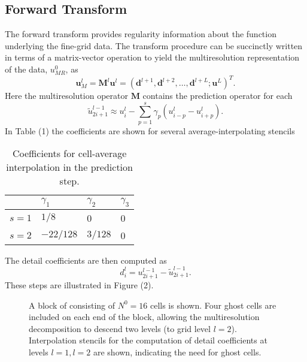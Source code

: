 \documentclass[12pt,letterpaper]{article}
\begin{document}

    \subsection*{Forward Transform}

        The forward transform provides regularity information about the function
        underlying the fine-grid data. The transform procedure can be succinctly
        written in terms of a matrix-vector operation to yield the
        multiresolution representation of the data, $u_{MR}^{0}$, as
        \begin{equation}
            \bm{u}_{M}^{l} = \bm{M}^{l} \bm{u}^{l} = \left( \bm{d}^{l+1}, \bm{d}^{l+2},
            \dots, \bm{d}^{l+L}; \bm{u}^{L} \right)^{T}.
        \end{equation}
        Here the multiresolution operator $\bm{M}$ contains the prediction
        operator for each
        \begin{equation}
            \tilde{u}_{2i+1}^{l-1} \approx u_{i}^{l} - \sum_{p=1}^{s}
            \gamma_{p} \left( u^{l}_{i-p} - u^{l}_{i+p} \right).
        \end{equation}
        In Table (1) the coefficients are shown for several average-interpolating stencils
        \begin{table}
            \centering
            \begin{tabular}{|l|l|l|l|}
            \hline
                & $\gamma_{1}$ & $\gamma_{2}$ & $\gamma_{3}$ \\ \hline
                $s=1$ & $1/8$ & 0 & 0 \\ \hline
                $s=2$ & $-22/128$ & $3/128$ & 0 \\ \hline
            \end{tabular}
            \caption{Coefficients for cell-average interpolation in the prediction step.}
        \end{table}
        The detail coefficients are then computed as
        \begin{equation}
            d^{l}_{i} = u^{l-1}_{2i+1} - \tilde{u}^{l-1}_{2i+1}.
        \end{equation}
        These steps are illustrated in Figure (2).

        \begin{figure}[H]
            \center
            
            \caption{A block of consisting of $N^{0} = 16$ cells is shown. Four
            ghost cells are included on each end of the block, allowing the
            multiresolution decomposition to descend two levels (to grid level
            $l=2$). Interpolation stencils for the computation of detail
            coefficients at levels $l=1, l=2$ are shown, indicating the need for ghost cells.}
        \end{figure}
\end{document}
